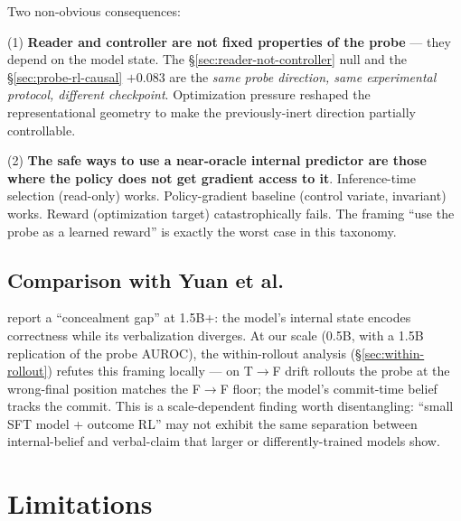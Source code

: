 \documentclass[11pt]{article}
\begin{document}
Two non-obvious consequences:

(1) \textbf{Reader and controller are not fixed properties of the probe} --- they depend on the model state. The §\ref{sec:reader-not-controller} null and the §\ref{sec:probe-rl-causal} $+0.083$ are the \emph{same probe direction, same experimental protocol, different checkpoint}. Optimization pressure reshaped the representational geometry to make the previously-inert direction partially controllable.

(2) \textbf{The safe ways to use a near-oracle internal predictor are those where the policy does not get gradient access to it}. Inference-time selection (read-only) works. Policy-gradient baseline (control variate, invariant) works. Reward (optimization target) catastrophically fails. The framing ``use the probe as a learned reward'' is exactly the worst case in this taxonomy.

\subsection{Comparison with Yuan et al.}

\citet{yuan2024probing} report a ``concealment gap'' at 1.5B+: the model's internal state encodes correctness while its verbalization diverges. At our scale (0.5B, with a 1.5B replication of the probe AUROC), the within-rollout analysis (§\ref{sec:within-rollout}) refutes this framing locally --- on T$\to$F drift rollouts the probe at the wrong-final position matches the F$\to$F floor; the model's commit-time belief tracks the commit. This is a scale-dependent finding worth disentangling: ``small SFT model + outcome RL'' may not exhibit the same separation between internal-belief and verbal-claim that larger or differently-trained models show.

\section{Limitations}
\end{document}
